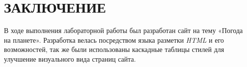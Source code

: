 \documentclass[a4paper,hidelinks,14pt]{extarticle}
\begin{document}
\section*{ЗАКЛЮЧЕНИЕ}

В ходе выполнения лабораторной работы был разработан сайт на тему «Погода на планете». Разработка велась посредством языка разметки \textit{HTML} и его возможностей, так же были использованы каскадные таблицы стилей для улучшение визуального вида страниц сайта.


%
%

%
\end{document}
